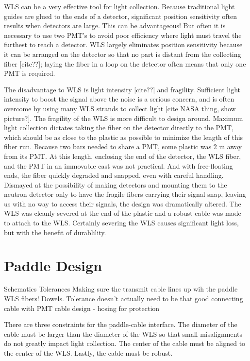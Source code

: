 WLS can be a very effective tool for light collection.  Because traditional light guides are glued to the ends of a detector, significant position sensitivity often results when detectors are large.  This can be advantageous!  But often it is necessary to use two PMT's to avoid poor efficiency where light must travel the furthest to reach a detector.  WLS largely eliminates position sensitivity because it can be arranged on the detector so that no part is distant from the collecting fiber [cite??]; laying the fiber in a loop on the detector often means that only one PMT is required.

The disadvantage to WLS is light intensity [cite??] and fragility.  Sufficient light intensity to boost the signal above the noise is a serious concern, and is often overcome by using many WLS strands to collect light [cite NASA thing, show picture?].  The fragility of the WLS is more difficult to design around.  Maximum light collection dictates taking the fiber on the detector directly to the PMT, which should be as close to the plastic as possible to minimize the length of this fiber run.  Because two bars needed to share a PMT, some plastic was 2 m away from its PMT.  At this length, enclosing the end of the detector, the WLS fiber, and the PMT in an immovable cast was not practical.  And with free-floating ends, the fiber quickly degraded and snapped, even with careful handling.  Dismayed at the possibility of making detectors and mounting them to the neutron detector only to have the fragile fibers carrying their signal snap, leaving us with no way to access their signals, the design was dramatically altered.  The WLS was cleanly severed at the end of the plastic and a robust cable was made to attach to the WLS.  Certainly severing the WLS causes significant light loss, but with the benefit of durablility.  

\section{Paddle Design}
Schematics
Tolerances
Making sure the transmit cable lines up wih the paddle WLS fibers!  Dowels.  Tolerance doesn't actually need to be that good
connecting cable with PMT
cable design - hosing for protection

There are three constraints for the paddle-cable interface.  The diameter of the cable must be larger than the diameter of the WLS so that small misalignments do not greatly impact light collection.  The center of the cable must be aligned to the center of the WLS.  Lastly, the cable must be robust.

